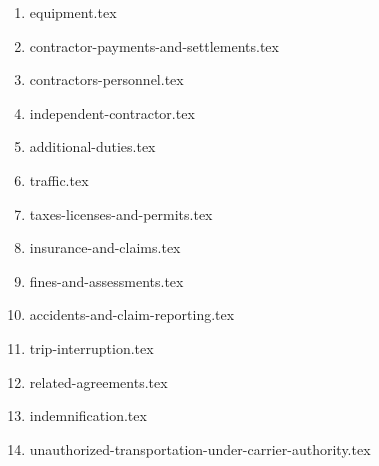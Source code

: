 \begin{enumerate}
    \item {equipment.tex}
    \item {contractor-payments-and-settlements.tex}
    \item {contractors-personnel.tex}
    \item {independent-contractor.tex}
    \item {additional-duties.tex}
    \item {traffic.tex}
    \item {taxes-licenses-and-permits.tex}
    \item {insurance-and-claims.tex}
    \item {fines-and-assessments.tex}
    \item {accidents-and-claim-reporting.tex}
    \item {trip-interruption.tex}
    \item {related-agreements.tex}
    \item {indemnification.tex}
    \item {unauthorized-transportation-under-carrier-authority.tex}
\end{enumerate}